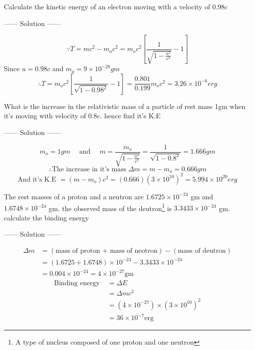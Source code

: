 \begin{example}
Calculate the kinetic energy of an electron moving with a velocity of 0.98c
\begin{center}
    ------ \textcolor{Solution}{Solution} ------
\end{center}
\[
\because T = mc^2 - m_o c^2 = m_o c^2 \left[\frac{1}{\sqrt{1- \frac{u^2}{c^2}}}-1\right]
\]
Since $u= 0.98c$ and $m_o = 9\times 10^{-28}\si{gm}$
\[
\therefore T = m_o c^2 \left[\frac{1}{\sqrt{1- 0.98^2}}-1\right]  = \frac{0.801}{0.199}m_o c^2 = 3.26 \times 10^{-6} \si{erg}
\]
\end{example}
\begin{example}
What is the increase in the relativistic mass of a particle of rest mass 1gm when it's moving with velocity of 0.8c. hence find it's K.E
\begin{center}
    ------ \textcolor{Solution}{Solution} ------
\end{center}
\[
m_o = 1gm \ \ \ \ \ \ \text{and} \ \ \ \ \ \ m = \frac{m_o}{\sqrt{1 - \frac{u^2}{c^2}}} = \frac{1}{\sqrt{1 - 0.8^2}} = 1.666\si{gm}
\]
\[
\therefore \text{The increase in it's mass } \Delta m = m-m_o = 0.666\si{gm} 
\]
\[
\text{And it's K.E } = (m-m_o)c^2 = (0.666){(3 \times 10^{10})}^2 = 5.994\times 10^{20}\si{erg}
\]
\end{example}

\begin{example}
The rest masses of a proton and a neutron are $1.6725 \times 10^{-24}$ gm and $1.6748 \times 10^{-24}$ gm.
the observed mass of the deutron\footnote{A type of nucleus composed of one proton and one neutron}
is $3.3433 \times 10^{-24}$ gm. calculate the binding energy
\begin{center}
    ------ \textcolor{Solution}{Solution} ------
\end{center}
\begin{align*}
    \Delta m &= (\text{mass of proton + mass of neotron}) - (\text{mass of deutron})\\
             &= (1.6725 + 1.6748)\times 10^{-24} - 3.3433 \times 10^{-24}\\
             &= 0.004 \times 10^{-24} = 4 \times 10^{-27} \text{gm}
\end{align*}
\begin{align*}
    \text{Binding energy } &= \Delta E \\
                           &= \Delta m c^2\\
                           &= \left(4 \times 10^{-27}\right)\times{\left(3 \times 10^{10}\right)}^2\\                           
                           &=36\times 10^{-7}\text{erg}
\end{align*}
\end{example}

